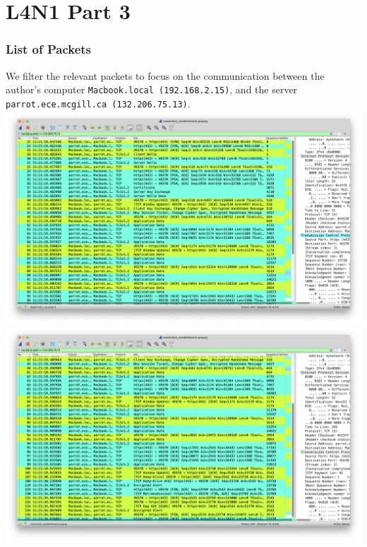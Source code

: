 \documentclass[../main.tex]{subfiles}
\begin{document}
\providecommand{\localhost}{\lstinline{Macbook.local (192.168.2.15)}}
\providecommand{\server}{\lstinline{parrot.ece.mcgill.ca (132.206.75.13)}}
\section*{L4N1 Part 3} 
\subsubsection*{List of Packets}
We filter the relevant packets to focus on the communication between the author's computer \localhost, and the server \server.\\
    \includegraphics[width=\textwidth]{subfiles/images/L4N1_PAGE15_LIST_OF_PACKETS_1.png}
    \includegraphics[width=\textwidth]{subfiles/images/L4N1_PAGE15_LIST_OF_PACKETS_2.png}
\newpage
\end{document}
